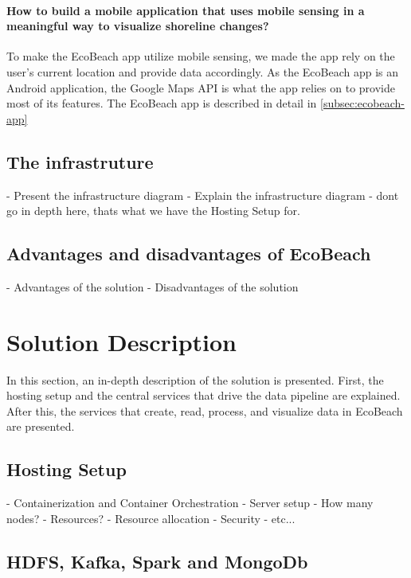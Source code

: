 \paragraph{How to build a mobile application that uses mobile sensing in a meaningful way to visualize shoreline changes?} To make the EcoBeach app utilize mobile sensing, we made the app rely on the user's current location and provide data accordingly. As the EcoBeach app is an Android application, the Google Maps API is what the app relies on to provide most of its features. The EcoBeach app is described in detail in \autoref{subsec:ecobeach-app}

\subsection{The infrastruture}\label{subsec:the-infrastructure}
- Present the infrastructure diagram
- Explain the infrastructure diagram
- dont go in depth here, thats what we have the Hosting Setup for.

\subsection{Advantages and disadvantages of EcoBeach}
- Advantages of the solution
- Disadvantages of the solution

\section{Solution Description}

In this section, an in-depth description of the solution is presented.  First, the hosting setup and the central services that drive the data pipeline are explained. After this, the services that create, read, process, and visualize data in EcoBeach are presented.

\subsection{Hosting Setup} \label{subsec:hosting-setup}

- Containerization and Container Orchestration
- Server setup
- How many nodes?
- Resources?
- Resource allocation
- Security
- etc...

\subsection{HDFS, Kafka, Spark and MongoDb} \label{subsec:the-stack}

